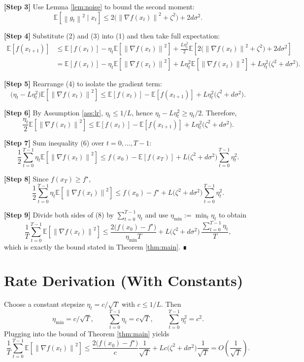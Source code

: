 \documentclass{article}
\newcommand{\E}{\mathbb{E}}
\newcommand{\norm}[1]{\left\|#1\right\|}
\begin{document}
\noindent\textbf{[Step 3]} Use Lemma \ref{lem:noise} to bound the second moment:
\[
\E\!\left[\norm{g_{t}}^{2}\mid x_{t}\right]
\le 2\bigl(\norm{\nabla f(x_{t})}^{2}+\zeta^{2}\bigr)+2d\sigma^{2}.
\tag{3}
\]

\noindent\textbf{[Step 4]} Substitute (2) and (3) into (1) and then take full expectation:
\[
\begin{aligned}
\E[f(x_{t+1})]
&\le \E[f(x_{t})]
-\eta_{t}\E\!\left[\norm{\nabla f(x_{t})}^{2}\right]
+\frac{L\eta_{t}^{2}}{2}\E\!\left[2\bigl(\norm{\nabla f(x_{t})}^{2}+\zeta^{2}\bigr)+2d\sigma^{2}\right]\\
&= \E[f(x_{t})]
-\eta_{t}\E\!\left[\norm{\nabla f(x_{t})}^{2}\right]
+L\eta_{t}^{2}\E\!\left[\norm{\nabla f(x_{t})}^{2}\right]
+L\eta_{t}^{2}\bigl(\zeta^{2}+d\sigma^{2}\bigr).
\end{aligned}
\tag{4}
\]

\noindent\textbf{[Step 5]} Rearrange (4) to isolate the gradient term:
\[
\bigl(\eta_{t}-L\eta_{t}^{2}\bigr)\E\!\left[\norm{\nabla f(x_{t})}^{2}\right]
\le \E[f(x_{t})]-\E[f(x_{t+1})]
+L\eta_{t}^{2}\bigl(\zeta^{2}+d\sigma^{2}\bigr).
\tag{5}
\]

\noindent\textbf{[Step 6]} By Assumption \ref{ass:lr}, $\eta_{t}\le 1/L$, hence $\eta_{t}-L\eta_{t}^{2}\ge \eta_{t}/2$. Therefore,
\[
\frac{\eta_{t}}{2}\E\!\left[\norm{\nabla f(x_{t})}^{2}\right]
\le \E[f(x_{t})]-\E[f(x_{t+1})]
+L\eta_{t}^{2}\bigl(\zeta^{2}+d\sigma^{2}\bigr).
\tag{6}
\]

\noindent\textbf{[Step 7]} Sum inequality (6) over $t=0,\dots ,T-1$:
\[
\frac{1}{2}\sum_{t=0}^{T-1}\eta_{t}\E\!\left[\norm{\nabla f(x_{t})}^{2}\right]
\le f(x_{0})- \E[f(x_{T})]
+L\bigl(\zeta^{2}+d\sigma^{2}\bigr)\sum_{t=0}^{T-1}\eta_{t}^{2}.
\tag{7}
\]

\noindent\textbf{[Step 8]} Since $f(x_{T})\ge f^{\star}$,
\[
\frac{1}{2}\sum_{t=0}^{T-1}\eta_{t}\E\!\left[\norm{\nabla f(x_{t})}^{2}\right]
\le f(x_{0})-f^{\star}
+L\bigl(\zeta^{2}+d\sigma^{2}\bigr)\sum_{t=0}^{T-1}\eta_{t}^{2}.
\tag{8}
\]

\noindent\textbf{[Step 9]} Divide both sides of (8) by $\sum_{t=0}^{T-1}\eta_{t}$ and use $\eta_{\min}:=\min_{t}\eta_{t}$ to obtain
\[
\frac{1}{T}\sum_{t=0}^{T-1}\E\!\left[\norm{\nabla f(x_{t})}^{2}\right]
\le
\frac{2\bigl(f(x_{0})-f^{\star}\bigr)}{\eta_{\min}T}
+L\bigl(\zeta^{2}+d\sigma^{2}\bigr)\,\frac{\sum_{t=0}^{T-1}\eta_{t}}{T},
\]
which is exactly the bound stated in Theorem \ref{thm:main}. ∎

\section*{Rate Derivation (With Constants)}
Choose a constant stepsize $\eta_{t}=c/\sqrt{T}$ with $c\le 1/L$. Then
\[
\eta_{\min}=c/\sqrt{T},\qquad
\sum_{t=0}^{T-1}\eta_{t}=c\sqrt{T},\qquad
\sum_{t=0}^{T-1}\eta_{t}^{2}=c^{2}.
\]
Plugging into the bound of Theorem \ref{thm:main} yields
\[
\frac{1}{T}\sum_{t=0}^{T-1}\E\!\left[\norm{\nabla f(x_{t})}^{2}\right]
\le
\frac{2\bigl(f(x_{0})-f^{\star}\bigr)}{c}\frac{1}{\sqrt{T}}
+Lc\bigl(\zeta^{2}+d\sigma^{2}\bigr)\frac{1}{\sqrt{T}}
=O\!\left(\frac{1}{\sqrt{T}}\right).
\]
\end{document}
